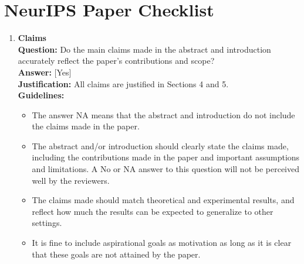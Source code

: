 \section*{NeurIPS Paper Checklist}

\begin{enumerate}
\item \textbf{Claims}\\
\textbf{Question:} Do the main claims made in the abstract and introduction accurately reflect the paper's contributions and scope?\\
\textbf{Answer:} [Yes]\\
\textbf{Justification:} All claims are justified in Sections 4 and 5.\\
\textbf{Guidelines:}
\begin{itemize}
\item The answer NA means that the abstract and introduction do not include the claims made in the paper.
\item The abstract and/or introduction should clearly state the claims made, including the contributions made in the paper and important assumptions and limitations. A No or NA answer to this question will not be perceived well by the reviewers.
\item The claims made should match theoretical and experimental results, and reflect how much the results can be expected to generalize to other settings.
\item It is fine to include aspirational goals as motivation as long as it is clear that these goals are not attained by the paper.
\end{itemize}


\end{enumerate}
